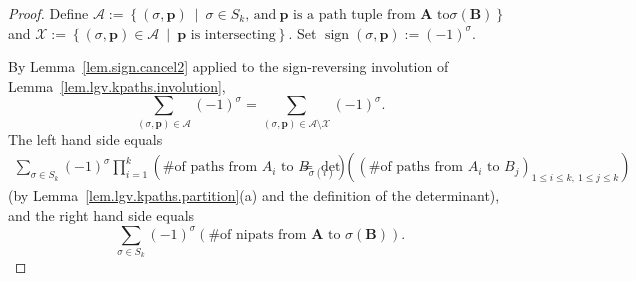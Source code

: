 \begin{proof}
Define
$\mathcal{A}:=\left\{  \left(  \sigma,\mathbf{p}\right)  \ \mid\ \sigma\in
S_{k}\text{, and}\ \mathbf{p}\text{ is a path tuple from }\mathbf{A}\text{ to
}\sigma\left(  \mathbf{B}\right)  \right\}$
and
$\mathcal{X}:=\left\{  \left(
\sigma,\mathbf{p}\right)  \in\mathcal{A}\ \mid\ \mathbf{p}\text{ is
intersecting}\right\}$.
Set
$\operatorname{sign}\left(  \sigma,\mathbf{p}\right)  :=\left(  -1\right)
^{\sigma}$.

By Lemma~\ref{lem.sign.cancel2} applied to the sign-reversing involution
of Lemma~\ref{lem.lgv.kpaths.involution},
\[
\sum_{\left(  \sigma,\mathbf{p}\right)  \in\mathcal{A}}\left(  -1\right)
^{\sigma}=\sum_{\left(  \sigma,\mathbf{p}\right)  \in\mathcal{A}%
\setminus\mathcal{X}}\left(  -1\right)  ^{\sigma}.
\]
The left hand side equals
\begin{align*}
\sum_{\sigma\in S_{k}}\left(  -1\right)  ^{\sigma}\prod_{i=1}^{k}\left(
\text{\# of paths from }A_{i}\text{ to }B_{\sigma\left(  i\right)  }\right)
&  =\det\left(  \left(  \text{\# of paths from }A_{i}\text{ to }B_{j}\right)
_{1\leq i\leq k,\ 1\leq j\leq k}\right)
\end{align*}
(by Lemma~\ref{lem.lgv.kpaths.partition}(a) and the definition of the
determinant), and the right hand side equals
\[
\sum_{\sigma\in S_{k}}\left(  -1\right)  ^{\sigma}\left(  \text{\# of
nipats from }\mathbf{A}\text{ to }\sigma\left(  \mathbf{B}\right)  \right).
\]
\end{proof}
